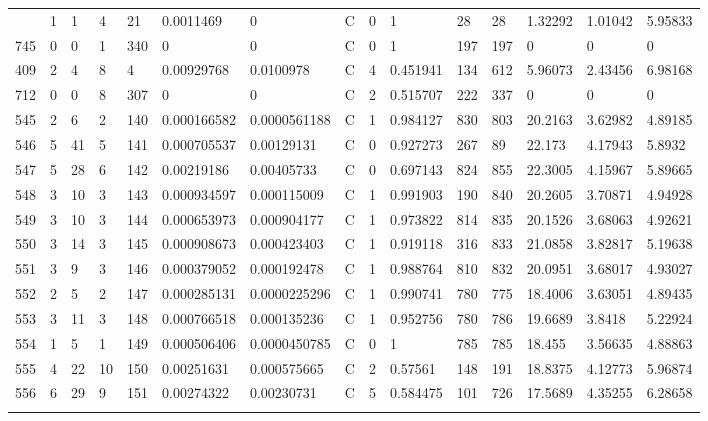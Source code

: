 \begin{latin}
\begin{longtable}{lllllllllllllll}
\begin{comment}
	426 & 1  & 1   & 4  & 21  & 0.0011469      & 0              & C & 0  & 1        & 28   & 28   & 1.32292 & 1.01042 & 5.95833 \\
	745 & 0  & 0   & 1  & 340 & 0              & 0              & C & 0  & 1        & 197  & 197  & 0       & 0       & 0       \\
	409 & 2  & 4   & 8  & 4   & 0.00929768     & 0.0100978      & C & 4  & 0.451941 & 134  & 612  & 5.96073 & 2.43456 & 6.98168 \\
	712 & 0  & 0   & 8  & 307 & 0              & 0              & C & 2  & 0.515707 & 222  & 337  & 0       & 0       & 0       \\
	545 & 2  & 6   & 2  & 140 & 0.000166582    & 0.0000561188   & C & 1  & 0.984127 & 830  & 803  & 20.2163 & 3.62982 & 4.89185 \\
	546 & 5  & 41  & 5  & 141 & 0.000705537    & 0.00129131     & C & 0  & 0.927273 & 267  & 89   & 22.173  & 4.17943 & 5.8932  \\
	547 & 5  & 28  & 6  & 142 & 0.00219186     & 0.00405733     & C & 0  & 0.697143 & 824  & 855  & 22.3005 & 4.15967 & 5.89665 \\
	548 & 3  & 10  & 3  & 143 & 0.000934597    & 0.000115009    & C & 1  & 0.991903 & 190  & 840  & 20.2605 & 3.70871 & 4.94928 \\
	549 & 3  & 10  & 3  & 144 & 0.000653973    & 0.000904177    & C & 1  & 0.973822 & 814  & 835  & 20.1526 & 3.68063 & 4.92621 \\
	550 & 3  & 14  & 3  & 145 & 0.000908673    & 0.000423403    & C & 1  & 0.919118 & 316  & 833  & 21.0858 & 3.82817 & 5.19638 \\
	551 & 3  & 9   & 3  & 146 & 0.000379052    & 0.000192478    & C & 1  & 0.988764 & 810  & 832  & 20.0951 & 3.68017 & 4.93027 \\
	552 & 2  & 5   & 2  & 147 & 0.000285131    & 0.0000225296   & C & 1  & 0.990741 & 780  & 775  & 18.4006 & 3.63051 & 4.89435 \\
	553 & 3  & 11  & 3  & 148 & 0.000766518    & 0.000135236    & C & 1  & 0.952756 & 780  & 786  & 19.6689 & 3.8418  & 5.22924 \\
	554 & 1  & 5   & 1  & 149 & 0.000506406    & 0.0000450785   & C & 0  & 1        & 785  & 785  & 18.455  & 3.56635 & 4.88863 \\
	555 & 4  & 22  & 10 & 150 & 0.00251631     & 0.000575665    & C & 2  & 0.57561  & 148  & 191  & 18.8375 & 4.12773 & 5.96874 \\
	556 & 6  & 29  & 9  & 151 & 0.00274322     & 0.00230731     & C & 5  & 0.584475 & 101  & 726  & 17.5689 & 4.35255 & 6.28658 \\

\end{comment}
\end{longtable}
\end{latin}
